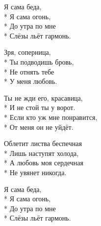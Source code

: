 \medskip

\begin{minipage}{\linewidth}
\hspace*{1.5em}Я сама беда,\\*
\hspace*{1.5em}Я сама огонь,\\*
\hspace*{1.5em}До утра по мне\\*
\hspace*{1.5em}Слёзы льёт гармонь.\\
\end{minipage}\par\medskip\nobreak

\medskip

\begin{minipage}{\linewidth}
\hspace*{1.5em}Зря, соперница,\\*
\hspace*{1.5em}Ты подводишь бровь,\\*
\hspace*{1.5em}Не отнять тебе\\*
\hspace*{1.5em}У меня любовь.\\
\end{minipage}\par\medskip\nobreak

\medskip

\begin{minipage}{\linewidth}
Ты не жди его, красавица,\\*
И не стой ты у ворот.\\*
Если кто уж мне понравится,\\*
От меня он не уйдёт.\\
\end{minipage}\par\medskip\nobreak

\medskip

\begin{minipage}{\linewidth}
Облетит листва беспечная\\*
Лишь наступят холода,\\*
А любовь моя сердечная\\*
Не увянет никогда.\\
\end{minipage}\par\medskip\nobreak

\medskip

\begin{minipage}{\linewidth}
\hspace*{1.5em}Я сама беда,\\*
\hspace*{1.5em}Я сама огонь,\\*
\hspace*{1.5em}До утра по мне\\*
\hspace*{1.5em}Слёзы льёт гармонь.\\
\end{minipage}\par\medskip\nobreak

